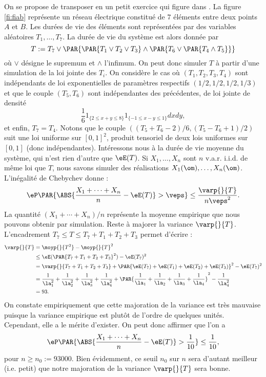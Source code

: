 On se propose de transposer en \ML{} un petit exercice qui figure dans
\cite[page 82]{bouleau}. La figure \ref{fi:fiab} représente un réseau
électrique constitué de $7$ éléments entre deux points $A$ et $B$. Les durées
de vie des éléments sont représentées par des variables aléatoires
$T_1,\ldots,T_7$. La durée de vie du système est alors donnée par
$$
 T := T_7 \lor \PAR{\PAR{T_1 \lor T_2 \lor T_3} \land \PAR{T_6 \lor \PAR{T_4 \land T_5}}}
$$
où $\lor$ désigne le supremum et $\land$ l'infimum. On peut donc simuler $T$
à partir d'une simulation de la loi jointe des $T_i$.
%
%
On considère le cas où $(T_1,T_2,T_3,T_4)$ sont indépendants de loi
exponentielles de paramètres respectifs $(1/2,1/2,1/2,1/3)$ et que le couple
$(T_5,T_6)$ sont indépendantes des précédentes, de loi jointe de densité
$$
\frac{1}{6} 1_{\{2\leq x+y \leq 8\}} 1_{\{-1\leq x-y \leq 1\}} dx dy,
$$
et enfin, $T_7=T_4$.  Notons que le couple $((T_5+T_6-2)/6,(T_5-T_6+1)/2)$
suit une loi uniforme sur $[0,1]^2$, produit tensoriel de deux lois uniformes
sur $[0,1]$ (donc indépendantes).
%
%
Intéressons nous à la durée de vie moyenne du système, qui n'est rien d'autre
que $\eE(T)$.  Si $X_1,\ldots,X_n$ sont $n$ v.a.r. i.i.d. de même loi que $T$,
nous savons simuler des réalisations $X_1(\om),\ldots,X_n(\om)$. L'inégalité
de Chebychev donne :
$$
\eP\PAR{\ABS{\frac{X_1+\cdots+X_n}{n}-\eE(T)}>\veps} \leq\frac{\varp{}{T}}{n\veps^2}.
$$
La quantité $(X_1+\cdots+X_n)/n$ représente la moyenne empirique que nous
pouvons obtenir par simulation. Reste à majorer la variance $\varp{}{T}$.
L'encadrement $T_7 \leq T \leq T_7+T_1+T_2+T_3$ permet d'écrire :
\begin{align*}
  \varp{}{T}&=\moyp{}{T^2}-\moyp{}{T}^2\\
  &\leq\eE(\PAR{T_7+T_1+T_2+T_3}^2)-\eE(T_7)^2\\
  &=\varp{}{T_7+T_1+T_2+T_3}+\PAR{\eE(T_7)+\eE(T_1)+\eE(T_2)+\eE(T_3)}^2-\eE(T_7)^2\\
  &=\frac{1}{\la_1^2}+\frac{1}{\la_2^2}+\frac{1}{\la_3^2}+\frac{1}{\la_4^2}
  +\PAR{\frac{1}{\la_1}+\frac{1}{\la_2}+\frac{1}{\la_3}+\frac{1}{\la_4}}^2
  -\frac{1}{\la_4^2}\\
  &=93.
\end{align*}
On constate empiriquement que cette majoration de la variance est très
mauvaise puisque la variance empirique est plutôt de l'ordre de quelques
unités. Cependant, elle a le mérite d'exister.  On peut donc affirmer que l'on
a
$$
\eP\PAR{\ABS{\frac{X_1+\cdots+X_n}{n}-\eE(T)}>\frac{1}{10}}
\leq\frac{1}{10},
$$
pour $n\geq n_0:=93000$. Bien évidemment, ce seuil $n_0$ sur $n$ sera
d'autant meilleur (i.e. petit) que notre majoration de la variance $\varp{}{T}$
sera bonne. 

